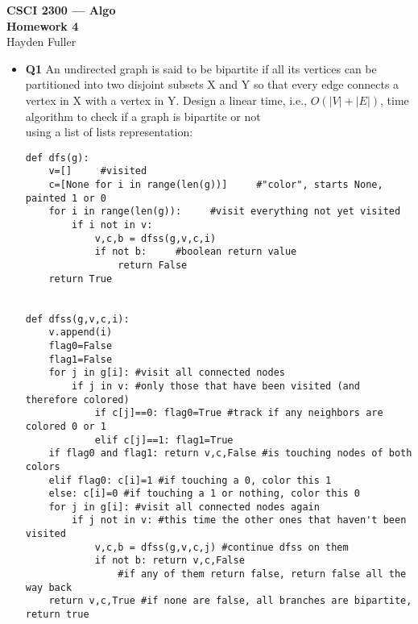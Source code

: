 \documentclass[11pt]{article}
\begin{document}
\thispagestyle{empty}   %

\begin{center}
\large
\textbf{CSCI 2300 --- Algo \\
Homework 4}
\\Hayden Fuller
\end{center}

\begin{itemize}

\item \textbf{Q1} 
An undirected graph is said to be bipartite if all its vertices can be partitioned into two disjoint subsets X and Y so that every edge connects a vertex in X with a vertex in Y. Design a linear time, i.e., $O(|V| + |E|)$, time algorithm to check if a graph is bipartite or not
\\using a list of lists representation: 
\begin{verbatim}
def dfs(g):
    v=[]     #visited
    c=[None for i in range(len(g))]     #"color", starts None, painted 1 or 0
    for i in range(len(g)):     #visit everything not yet visited
        if i not in v: 
            v,c,b = dfss(g,v,c,i)
            if not b:     #boolean return value
                return False
    return True


def dfss(g,v,c,i):
    v.append(i)
    flag0=False
    flag1=False
    for j in g[i]: #visit all connected nodes
        if j in v: #only those that have been visited (and therefore colored)
            if c[j]==0: flag0=True #track if any neighbors are colored 0 or 1
            elif c[j]==1: flag1=True
    if flag0 and flag1: return v,c,False #is touching nodes of both colors
    elif flag0: c[i]=1 #if touching a 0, color this 1
    else: c[i]=0 #if touching a 1 or nothing, color this 0
    for j in g[i]: #visit all connected nodes again
        if j not in v: #this time the other ones that haven't been visited
            v,c,b = dfss(g,v,c,j) #continue dfss on them
            if not b: return v,c,False 
                #if any of them return false, return false all the way back
    return v,c,True #if none are false, all branches are bipartite, return true
\end{verbatim}

\vspace{0.1in}


\end{itemize}
\end{document}
